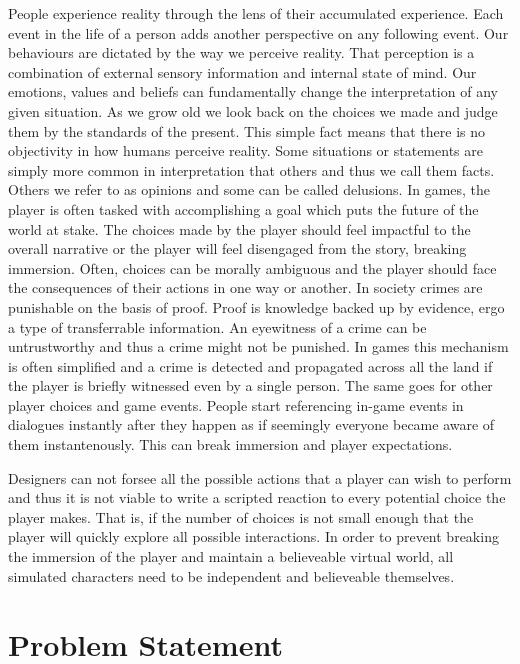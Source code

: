 People experience reality through the lens of their accumulated experience.
Each event in the life of a person adds another perspective on any following event.
Our behaviours are dictated by the way we perceive reality.
That perception is a combination of external sensory information and internal state of mind.
Our emotions, values and beliefs can fundamentally change the interpretation of any given situation.
As we grow old we look back on the choices we made and judge them by the standards of the present.
This simple fact means that there is no objectivity in how humans perceive reality.
Some situations or statements are simply more common in interpretation that others and thus we call them facts.
Others we refer to as opinions and some can be called delusions.
In games, the player is often tasked with accomplishing a goal which puts the future of the world at stake.
The choices made by the player should feel impactful to the overall narrative or the player will feel disengaged from the story, breaking immersion.
Often, choices can be morally ambiguous and the player should face the consequences of their actions in one way or another.
In society crimes are punishable on the basis of proof.
Proof is knowledge backed up by evidence, ergo a type of transferrable information.
An eyewitness of a crime can be untrustworthy and thus a crime might not be punished.
In games this mechanism is often simplified and a crime is detected and propagated across all the land if the player is briefly witnessed even by a single person.
The same goes for other player choices and game events.
People start referencing in-game events in dialogues instantly after they happen as if seemingly everyone became aware of them instantenously.
This can break immersion and player expectations.

Designers can not forsee all the possible actions that a player can wish to perform and thus it is not viable to write a scripted reaction to every potential choice the player makes.
That is, if the number of choices is not small enough that the player will quickly explore all possible interactions.
In order to prevent breaking the immersion of the player and maintain a believeable virtual world, all simulated characters need to be independent and believeable themselves.

\section*{Problem Statement}

